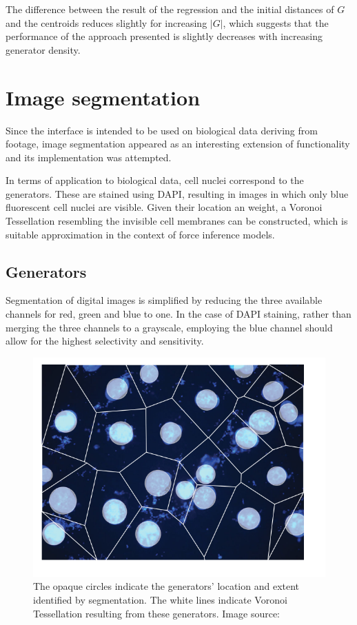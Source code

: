 \documentclass[a4paper]{article}
\begin{document}
The difference between the result of the regression and the initial distances of \(G\) and the centroids
reduces slightly for increasing \(|G|\), which suggests that the performance of the approach presented is
slightly decreases with increasing generator density.

\section{Image segmentation}
Since the interface is intended to be used on biological data deriving from footage, image segmentation
appeared as an interesting extension of functionality and its implementation was attempted.

In terms of application to biological data, cell nuclei correspond to the generators.
These are stained using DAPI, resulting in images in which only blue fluorescent cell nuclei are visible.
Given their location an weight, a Voronoi Tessellation resembling the invisible cell membranes can be constructed,
which is suitable approximation in the context of force inference models.

\subsection{Generators}
Segmentation of digital images is simplified by reducing the three available channels for red, green and blue to one.
In the case of DAPI staining, rather than merging the three channels to a grayscale, employing the blue channel should
allow for the highest selectivity and sensitivity.

\begin{figure}[H]
	\includegraphics[width=\textwidth]{generators_from_image.png}
	\caption{The opaque circles indicate the generators' location and extent identified by segmentation. The white lines
		indicate Voronoi Tessellation resulting from these generators. Image source: \cite{Folgueras-Flatschart2018}}
\end{figure}
\end{document}
